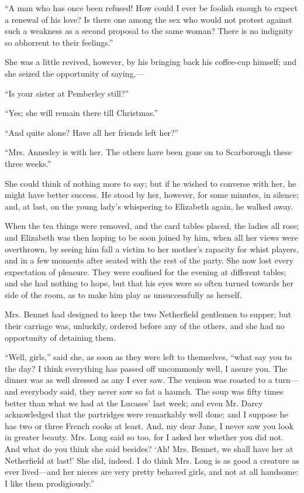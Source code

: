 \documentclass[12pt,openright]{book}
\begin{document}
“A man who has once been refused! How could I ever be foolish enough to expect a renewal of his love? Is there one among the sex who would not protest against such a weakness as a second proposal to the same woman? There is no indignity so abhorrent to their feelings.”

She was a little revived, however, by his bringing back his coffee-cup himself; and she seized the opportunity of saying,—

“Is your sister at Pemberley still?”

“Yes; she will remain there till Christmas.”

“And quite alone? Have all her friends left her?”

“Mrs. Annesley is with her. The others have been gone on to Scarborough these three weeks.”

She could think of nothing more to say; but if he wished to converse with her, he might have better success. He stood by her, however, for some minutes, in silence; and, at last, on the young lady’s whispering to Elizabeth again, he walked away.

When the tea things were removed, and the card tables placed, the ladies all rose; and Elizabeth was then hoping to be soon joined by him, when all her views were overthrown, by seeing him fall a victim to her mother’s rapacity for whist players, and in a few moments after seated with the rest of the party. She now lost every expectation of pleasure. They were confined for the evening at different tables; and she had nothing to hope, but that his eyes were so often turned towards her side of the room, as to make him play as unsuccessfully as herself.

Mrs. Bennet had designed to keep the two Netherfield gentlemen to supper; but their carriage was, unluckily, ordered before any of the others, and she had no opportunity of detaining them.

“Well, girls,” said she, as soon as they were left to themselves, “what say you to the day? I think everything has passed off uncommonly well, I assure you. The dinner was as well dressed as any I ever saw. The venison was roasted to a turn—and everybody said, they never saw so fat a haunch. The soup was fifty times better than what we had at the Lucases’ last week; and even Mr. Darcy acknowledged that the partridges were remarkably well done; and I suppose he has two or three French cooks at least. And, my dear Jane, I never saw you look in greater beauty. Mrs. Long said so too, for I asked her whether you did not. And what do you think she said besides? ‘Ah! Mrs. Bennet, we shall have her at Netherfield at last!’ She did, indeed. I do think Mrs. Long is as good a creature as ever lived—and her nieces are very pretty behaved girls, and not at all handsome: I like them prodigiously.”
\end{document}
